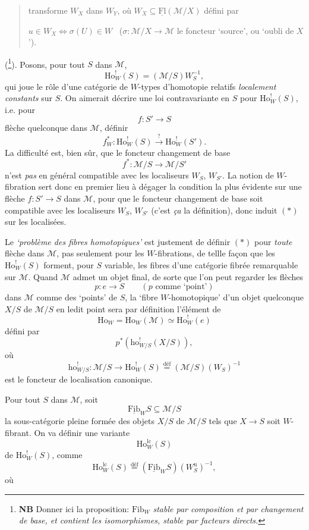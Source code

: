 \documentclass[11pt]{article}
\newcommand{\printedpage}[1]{\marginpar{\footnotesize p.~#1}}
\newcommand{\msp}[1]{\marginpar{\footnotesize [#1]}}
\newcommand{\Fib}{\underline{\mathrm{Fib}}}
\newcommand{\Fl}{\underline{\mathrm{Fl}}}
\newcommand{\cM}{\mathcal{M}}
\newcommand{\Ho}{\mathrm{Ho}}
\newcommand{\ho}{\mathrm{ho}}
\newcommand{\Wu}{W^{\mathrm{u}}}
\newcommand{\lc}{\mathrm{lc}}
\begin{document}
\printedpage{135}

\begin{quote}
transforme $W_X$ dans $W_Y$, où $W_X \subseteq \Fl(\cM/X)$ défini par

$u \in W_X \iff \sigma(U) \in W$ \ ($\sigma : \cM/X \longrightarrow \cM$ le foncteur ‘source’, ou ‘oubli de $X$’). %
\end{quote}

(\footnote[120]{\textbf{NB} Donner ici la proposition: $\mathrm{Fib}_W$ \textit{stable par composition et par changement de base, et contient les isomorphismes, stable par facteurs directs.}}). Posons, pour tout $S$ dans $\cM$,
\[
\Ho^!_W(S) = (\cM/S)W_S^{-1},
\]
qui joue le rôle d'une catégorie de $W$-types d'homotopie relatifs \textit{localement constants} sur $S$. On aimerait décrire une loi contravariante en $S$ pour $\Ho^!_W(S)$, i.e. pour
\[
f : S' \longrightarrow S
\]
flèche quelconque dans $\cM$, définir
\[
f^*_W : \Ho^!_W(S) \xrightarrow{?} \Ho^!_W(S'). \tag*{$(*)$}
\]
La difficulté est, bien sûr, que le foncteur changement de base
\[
f^* : \cM/S \longrightarrow \cM/S'
\]
n'est \textit{pas} en général compatible avec les \msp{page 209} localiseurs $W_S$, $W_{S'}$. La notion de $W$-fibration sert donc en premier lieu à dégager la condition la plus évidente sur une flèche $f : S' \longrightarrow S$ dans $\cM$, pour que le foncteur changement de base soit compatible avec les localiseurs $W_S$, $W_{S'}$ (c'est \textit{ça} la définition), donc induit $(*)$ sur les localisées.

Le \textit{‘problème des fibres homotopiques’} est justement de définir $(*)$ pour \textit{toute} flèche dans $\cM$, pas seulement pour les $W$-fibrations, de tellle façon que les $\Ho^!_W(S)$ forment, pour $S$ %
variable, les fibres d'une catégorie fibrée remarquable sur $\cM$. Quand $\cM$ admet un objet final, de sorte que l'on peut regarder les flèches
\[
p : e \longrightarrow S \qquad (p \text{ comme ‘point’})
\]
dans $\cM$ comme des ‘points’ de $S$, la ‘fibre $W$-homotopique’ d'un objet quelconque $X/S$ de $\cM/S$ en ledit point sera par définition l'élément de
\[
\Ho_W = \Ho_W(\cM) \simeq \Ho^!_W(e)
\]
défini par
\[
p^*(\ho^!_{W/S}(X/S)),
\]
\printedpage{136}
\msp{page 210}
où
\[
\ho^!_{W/S} : \cM/S \longrightarrow \Ho^!_W(S) \overset{\text{déf}}{=} (\cM/S)(W_S)^{-1}
\]
est le foncteur de localisation canonique.

Pour tout $S$ dans $\cM$, soit
\[
\Fib_W S \subseteq \cM/S
\]
la sous-catégorie pleine formée des objets $X/S$ de $\cM/S$ tels que $X \longrightarrow S$ soit $W$-fibrant. On va définir une variante
\[
\Ho^{\lc}_W(S)
\]
de $\Ho^!_W(S)$, comme
\[
\Ho^{\lc}_W(S) \overset{\text{déf}}{=} (\Fib_W S)(\Wu_S)^{-1},
\]
où
\end{document}
